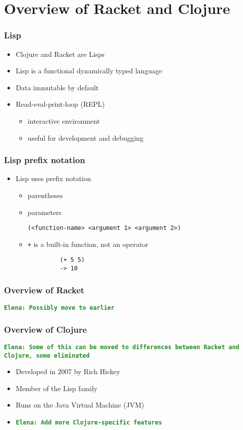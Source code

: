 \documentclass{beamer}
\newcommand{\comment}[1]{{\bf \tt  {#1}}}
\newcommand{\emcomment}[1]{\textcolor{ForestGreen}{\comment{Elena: {#1}}}}
\begin{document}
\section{Overview of Racket and Clojure}

\begin{frame}
\frametitle{Lisp}
\begin{itemize}
	\item Clojure and Racket are Lisps
	\item Lisp is a functional dynamically typed language
	\item Data immutable by default
  	 \item Read-eval-print-loop (REPL)
  	 	\begin{itemize}
  	 	\item interactive environment
  	 	\item useful for development and debugging
  	 	\end{itemize}
\end{itemize}
\end{frame}

\begin{frame}[fragile]
\frametitle{Lisp prefix notation}
	\begin{itemize}
  	  \item Lisp uses prefix notation
  	  \begin{itemize}
  	 	 \item parentheses
  	 	 \item parameters
  	 	 
  	 	 \texttt{(<function-name> <argument 1> <argument 2>)}
  	 	 \item \texttt{+} is a built-in function, not an operator
  	 	 \begin{verbatim}		
		 (+ 5 5)
		 -> 10
	     \end{verbatim}
	  \end{itemize}
   \end{itemize}
\end{frame}

\begin{frame}
\frametitle{Overview of Racket}
\emcomment{Possibly move to earlier}
\end{frame}

\begin{frame}
\frametitle{Overview of Clojure}
\emcomment{Some of this can be moved to differences between Racket and Clojure, some eliminated}
	\begin{itemize}
		\item Developed in 2007 by Rich Hickey
		\item Member of the Lisp family
  	 \item Runs on the Java Virtual Machine (JVM)

	\item \emcomment{Add more Clojure-specific features}
	 \end{itemize}
\end{frame}
\end{document}
